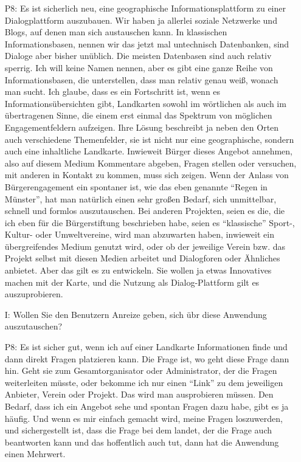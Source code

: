 \begin{itemize}
    \item[P8:] Es ist sicherlich neu, eine geographische Informationsplattform zu einer Dialogplattform auszubauen. Wir haben ja allerlei soziale Netzwerke und Blogs, auf denen man sich austauschen kann. In klassischen Informationsbasen, nennen wir das jetzt mal untechnisch Datenbanken, sind Dialoge aber bisher un{\"u}blich. Die meisten Datenbasen sind auch relativ sperrig. Ich will keine Namen nennen, aber es gibt eine ganze Reihe von Informationsbasen, die unterstellen, dass man relativ genau wei{\ss}, wonach man sucht. Ich glaube, dass es ein Fortschritt ist, wenn es Informations{\"u}bersichten gibt, Landkarten sowohl im w{\"o}rtlichen als auch im {\"u}bertragenen Sinne, die einem erst einmal das Spektrum von m{\"o}glichen Engagementfeldern aufzeigen. Ihre L{\"o}sung beschreibt ja neben den Orten auch verschiedene Themenfelder, sie ist nicht nur eine geographische, sondern auch eine inhaltliche Landkarte. Inwieweit B{\"u}rger dieses Angebot annehmen, also auf diesem Medium Kommentare abgeben, Fragen stellen oder versuchen, mit anderen in Kontakt zu kommen, muss sich zeigen. Wenn der Anlass von B{\"u}rgerengagement ein spontaner ist, wie das eben genannte "`Regen in M{\"u}nster"', hat man nat{\"u}rlich einen sehr gro{\ss}en Bedarf, sich unmittelbar, schnell und formlos auszutauschen. Bei anderen Projekten, seien es die, die ich eben f{\"u}r die B{\"u}rgerstiftung beschrieben habe, seien es "`klassische"' Sport-, Kultur- oder Umweltvereine, wird man abzuwarten haben, inwieweit ein {\"u}bergreifendes Medium genutzt wird, oder ob der jeweilige Verein bzw. das Projekt selbst mit diesen Medien arbeitet und Dialogforen oder {\"A}hnliches anbietet. Aber das gilt es zu entwickeln. Sie wollen ja etwas Innovatives machen mit der Karte, und die Nutzung als Dialog-Plattform gilt es auszuprobieren.
    \item[I:] Wollen Sie den Benutzern Anreize geben, sich {\"u}br diese Anwendung auszutauschen?
    \item[P8:] Es ist sicher gut, wenn ich auf einer Landkarte Informationen finde und dann direkt Fragen platzieren kann. Die Frage ist, wo geht diese Frage dann hin. Geht sie zum Gesamtorganisator oder Administrator, der die Fragen weiterleiten m{\"u}sste, oder bekomme ich nur einen "`Link"' zu dem jeweiligen Anbieter, Verein oder Projekt. Das wird man ausprobieren m{\"u}ssen. Den Bedarf, dass ich ein Angebot sehe und spontan Fragen dazu habe, gibt es ja h{\"a}ufig. Und wenn es mir einfach gemacht wird, meine Fragen loszuwerden, und sichergestellt ist, dass die Frage bei dem landet, der die Frage auch beantworten kann und das hoffentlich auch tut, dann hat die Anwendung einen Mehrwert.

\end{itemize}
